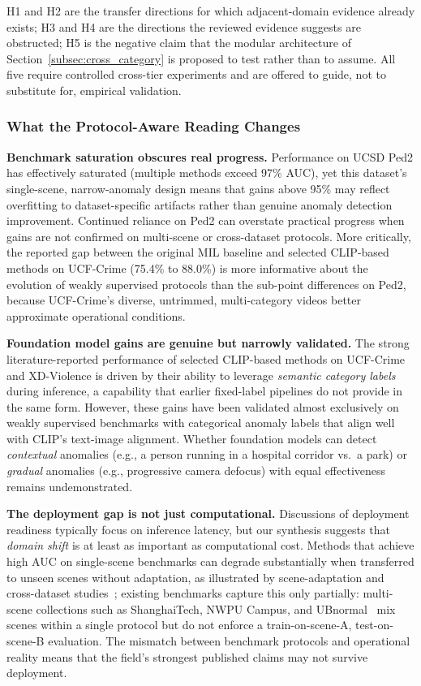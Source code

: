 \documentclass[10pt,a4paper]{article}
\begin{document}
H1 and H2 are the transfer directions for which adjacent-domain evidence already exists; H3 and H4 are the directions the reviewed evidence suggests are obstructed; H5 is the negative claim that the modular architecture of Section~\ref{subsec:cross_category} is proposed to test rather than to assume. All five require controlled cross-tier experiments and are offered to guide, not to substitute for, empirical validation.

\subsubsection{What the Protocol-Aware Reading Changes}

\textbf{Benchmark saturation obscures real progress.} Performance on UCSD Ped2 has effectively saturated (multiple methods exceed 97\% AUC), yet this dataset's single-scene, narrow-anomaly design means that gains above 95\% may reflect overfitting to dataset-specific artifacts rather than genuine anomaly detection improvement. Continued reliance on Ped2 can overstate practical progress when gains are not confirmed on multi-scene or cross-dataset protocols. More critically, the reported gap between the original MIL baseline and selected CLIP-based methods on UCF-Crime (75.4\% to 88.0\%) is more informative about the evolution of weakly supervised protocols than the sub-point differences on Ped2, because UCF-Crime's diverse, untrimmed, multi-category videos better approximate operational conditions.

\textbf{Foundation model gains are genuine but narrowly validated.} The strong literature-reported performance of selected CLIP-based methods on UCF-Crime and XD-Violence is driven by their ability to leverage \emph{semantic category labels} during inference, a capability that earlier fixed-label pipelines do not provide in the same form. However, these gains have been validated almost exclusively on weakly supervised benchmarks with categorical anomaly labels that align well with CLIP's text-image alignment. Whether foundation models can detect \emph{contextual} anomalies (e.g., a person running in a hospital corridor vs.\ a park) or \emph{gradual} anomalies (e.g., progressive camera defocus) with equal effectiveness remains undemonstrated.

\textbf{The deployment gap is not just computational.} Discussions of deployment readiness typically focus on inference latency, but our synthesis suggests that \emph{domain shift} is at least as important as computational cost. Methods that achieve high AUC on single-scene benchmarks can degrade substantially when transferred to unseen scenes without adaptation, as illustrated by scene-adaptation and cross-dataset studies~\citep{lu2020few}; existing benchmarks capture this only partially: multi-scene collections such as ShanghaiTech, NWPU Campus, and UBnormal~\citep{luo2017revisit, cao2023nwpu, acsintoae2022ubnormal} mix scenes within a single protocol but do not enforce a train-on-scene-A, test-on-scene-B evaluation. The mismatch between benchmark protocols and operational reality means that the field's strongest published claims may not survive deployment.
\end{document}
